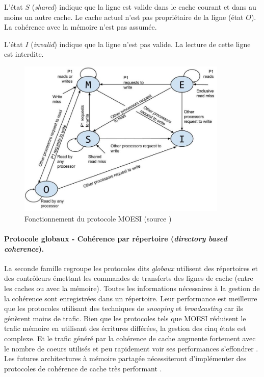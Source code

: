             L'état $S$ (\textit{shared}) indique que la ligne est valide dans le cache courant et dans au moins un autre cache. Le cache actuel n'est pas propriétaire de la ligne (état $O$). La cohérence avec la mémoire n'est pas assumée. 
            
            L'état $I$ (\textit{invalid}) indique que la ligne n'est pas valide. La lecture de cette ligne est interdite.
            
            
            \begin{figure}
                \center
                \includegraphics[width=10cm]{images/moesi.png}
                \caption{\label{pic:moesi} Fonctionnement du protocole MOESI (source \cite{Sayin2014})}
            \end{figure}
        

        
        
        
        \paragraph{Protocole globaux - Cohérence par répertoire (\textit{directory based coherence}).}
            
            La seconde famille regroupe les protocoles dits \textit{globaux} utilisent des répertoires et des contrôleurs émettant les commandes de transferts des lignes de cache (entre les caches ou avec la mémoire)\cite{tang1976cache}. Toutes les informations nécessaires à la gestion de la cohérence sont enregistrées dans un répertoire. Leur performance est meilleure que les protocoles utilisant des techniques de \textit{snooping} et \textit{broadcasting} car ils génèrent moins de trafic. Bien que les protocoles tels que MOESI réduisent le trafic mémoire en utilisant des écritures différées, la gestion des cinq états est complexe. Et le trafic généré par la cohérence de cache augmente fortement avec le nombre de coeurs utilisés et peu rapidement voir ses performances s'effondrer \cite{liu2016protocoles}. Les futures architectures à mémoire partagée nécessiteront d'implémenter des protocoles de cohérence de cache très performant  \cite{al2010snoopy}.
            


